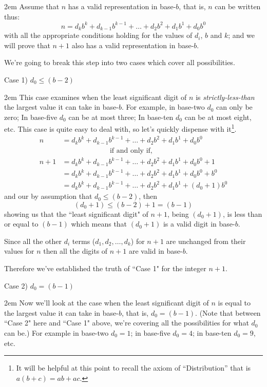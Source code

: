 \documentclass{article}
\newenvironment{jprIn}{\begin{adjustwidth}{2em}{}}{\end{adjustwidth}}
\begin{document}
\begin{jprIn}
Assume that $n$ has a valid representation in base-$b$,
that is, $n$ can be written thus: 
\[n=d_kb^k+d_{k-1}b^{k-1}+\dots+d_2b^2+d_1b^1+d_0b^0\]
with all the appropriate conditions holding for the
values of $d_i$, $b$ and $k$;
and we will prove that $n+1$ also has a valid representation in base-$b$.

We're going to break this step into two cases which cover all possibilities.

Case 1) $d_0\le(b-2)$

\begin{jprIn}
This case examines when the least significant
digit of $n$ is \emph{strictly-less-than} the largest value it can take in base-$b$.
For example, in base-two $d_0$ can only be zero;
In base-five $d_0$ can be at most three;
In base-ten $d_0$ can be at most eight, etc.
This case is
quite easy to deal with, so let's quickly dispense with it\footnote{It will be helpful at this point to recall the axiom of ``Distribution'' that is $a(b+c)=ab+ac$.}.
\begin{align*}
n &= d_kb^k+d_{k-1}b^{k-1}+\dots+d_2b^2+d_1b^1+d_0b^0\\
&\;\;\;\;\;\;\;\;\;\;\;\;\;\;\;\;\;\;\;\;\;\;\;\;\text{if and only if,}\\
n+1 &= d_kb^k+d_{k-1}b^{k-1}+\dots+d_2b^2+d_1b^1+d_0b^0 + 1\\
&= d_kb^k+d_{k-1}b^{k-1}+\dots+d_2b^2+d_1b^1+d_0b^0 + b^0\\
&= d_kb^k+d_{k-1}b^{k-1}+\dots+d_2b^2+d_1b^1 + (d_0+1)b^0
\end{align*}
and our by assumption that $d_0\le(b-2)$, then
\[(d_0+1)\le(b-2)+1=(b-1)\]
showing us that the ``least significant digit"
of $n+1$, being $(d_0+1)$, is less than or equal to $(b-1)$ which means that
$(d_0+1)$ is a valid digit in base-$b$.

Since all the other $d_i$ terms ($d_1,d_2,\dots,d_k$)
for $n+1$ are unchanged from their values for
$n$ then all the digits of $n+1$ are valid in base-$b$.

Therefore we've established the truth of ``Case 1" for the integer $n+1$.
\end{jprIn}
\bigskip

Case 2) $d_0=(b-1)$
\begin{jprIn}
Now we'll look at the case when the least significant digit of $n$ is equal
to the largest value it can take in base-$b$, that is,
$d_0=(b-1)$.
(Note that between ``Case 2" here and ``Case 1" above,
we're covering all the possibilities for what $d_0$ can be.)
For example in base-two
$d_0=1$; in base-five
$d_0=4$; in base-ten $d_0=9$, etc.


\end{jprIn}
\end{jprIn}
\end{document}
